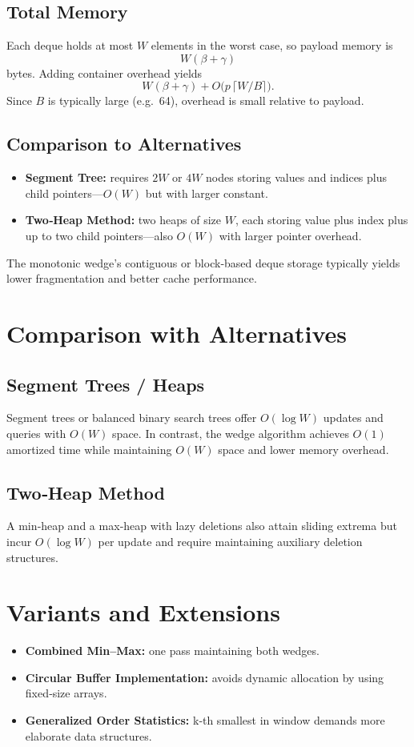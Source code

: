 \documentclass[12pt]{article}
\begin{document}
\subsection{Total Memory}
Each deque holds at most \(W\) elements in the worst case, so payload memory is
\[
W(\beta+\gamma)
\]
bytes.  Adding container overhead yields
\[
W(\beta+\gamma) + O\bigl(p\,\lceil W/B\rceil\bigr).
\]
Since \(B\) is typically large (e.g.\ 64), overhead is small relative to payload.

\subsection{Comparison to Alternatives}
\begin{itemize}
  \item \textbf{Segment Tree:} requires \(2W\) or \(4W\) nodes storing values and indices plus child pointers—\(O(W)\) but with larger constant.
  \item \textbf{Two‐Heap Method:} two heaps of size \(W\), each storing value plus index plus up to two child pointers—also \(O(W)\) with larger pointer overhead.
\end{itemize}
The monotonic wedge’s contiguous or block‐based deque storage typically yields lower fragmentation and better cache performance.

\section{Comparison with Alternatives}
\subsection{Segment Trees / Heaps}
Segment trees or balanced binary search trees offer \(O(\log W)\) updates and queries with \(O(W)\) space.  In contrast, the wedge algorithm achieves \(O(1)\) amortized time while maintaining \(O(W)\) space and lower memory overhead.

\subsection{Two‐Heap Method}
A min‐heap and a max‐heap with lazy deletions also attain sliding extrema but incur \(O(\log W)\) per update and require maintaining auxiliary deletion structures.

\section{Variants and Extensions}
\begin{itemize}
  \item \textbf{Combined Min–Max:} one pass maintaining both wedges.
  \item \textbf{Circular Buffer Implementation:} avoids dynamic allocation by using fixed‐size arrays.
  \item \textbf{Generalized Order Statistics:} k‐th smallest in window demands more elaborate data structures.
\end{itemize}
\end{document}
